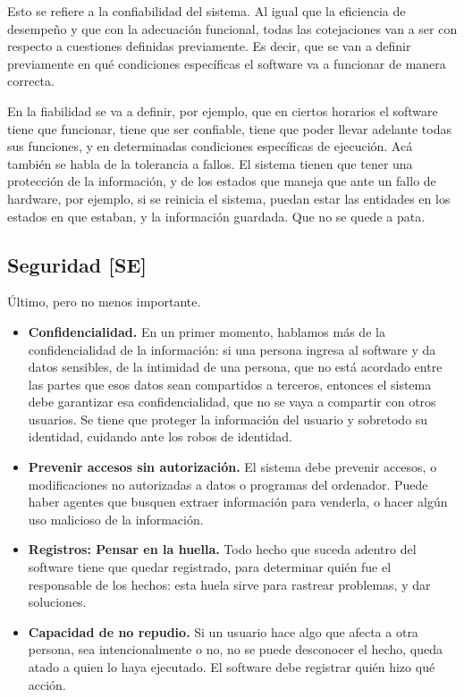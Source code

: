 Esto se refiere a la confiabilidad del sistema. Al igual que la
eficiencia de desempeño y que con la adecuación funcional, todas las
cotejaciones van a ser con respecto a cuestiones definidas previamente.
Es decir, que se van a definir previamente en qué condiciones
específicas el software va a funcionar de manera correcta.

En la fiabilidad se va a definir, por ejemplo, que en ciertos horarios
el software tiene que funcionar, tiene que ser confiable, tiene que
poder llevar adelante todas sus funciones, y en determinadas condiciones
específicas de ejecución. Acá también se habla de la tolerancia a
fallos. El sistema tienen que tener una protección de la información, y
de los estados que maneja que ante un fallo de hardware, por ejemplo, si
se reinicia el sistema, puedan estar las entidades en los estados en que
estaban, y la información guardada. Que no se quede a pata.

\hypertarget{seguridad-se}{%
\subsection{Seguridad {[}SE{]}}\label{seguridad-se}}

Último, pero no menos importante.

\begin{itemize}

\item
  \textbf{Confidencialidad.} En un primer momento, hablamos más de la
  confidencialidad de la información: si una persona ingresa al software
  y da datos sensibles, de la intimidad de una persona, que no está
  acordado entre las partes que esos datos sean compartidos a terceros,
  entonces el sistema debe garantizar esa confidencialidad, que no se
  vaya a compartir con otros usuarios. Se tiene que proteger la
  información del usuario y sobretodo su identidad, cuidando ante los
  robos de identidad.
\item
  \textbf{Prevenir accesos sin autorización.} El sistema debe prevenir
  accesos, o modificaciones no autorizadas a datos o programas del
  ordenador. Puede haber agentes que busquen extraer información para
  venderla, o hacer algún uso malicioso de la información.
\item
  \textbf{Registros: Pensar en la huella.} Todo hecho que suceda adentro
  del software tiene que quedar registrado, para determinar quién fue el
  responsable de los hechos: esta huela sirve para rastrear problemas, y
  dar soluciones.
\item
  \textbf{Capacidad de no repudio.} Si un usuario hace algo que afecta a
  otra persona, sea intencionalmente o no, no se puede desconocer el
  hecho, queda atado a quien lo haya ejecutado. El software debe
  registrar quién hizo qué acción.
\end{itemize}

